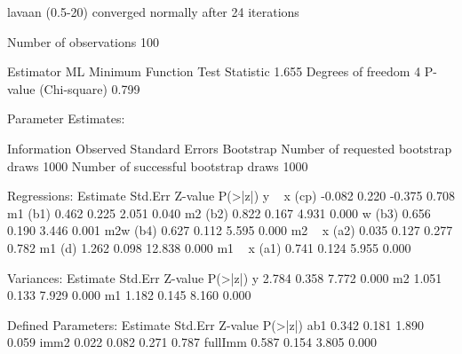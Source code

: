\begin{Schunk}
\begin{Soutput}
lavaan (0.5-20) converged normally after  24 iterations

  Number of observations                           100

  Estimator                                         ML
  Minimum Function Test Statistic                1.655
  Degrees of freedom                                 4
  P-value (Chi-square)                           0.799

Parameter Estimates:

  Information                                 Observed
  Standard Errors                            Bootstrap
  Number of requested bootstrap draws             1000
  Number of successful bootstrap draws            1000

Regressions:
                   Estimate  Std.Err  Z-value  P(>|z|)
  y ~                                                 
    x         (cp)   -0.082    0.220   -0.375    0.708
    m1        (b1)    0.462    0.225    2.051    0.040
    m2        (b2)    0.822    0.167    4.931    0.000
    w         (b3)    0.656    0.190    3.446    0.001
    m2w       (b4)    0.627    0.112    5.595    0.000
  m2 ~                                                
    x         (a2)    0.035    0.127    0.277    0.782
    m1         (d)    1.262    0.098   12.838    0.000
  m1 ~                                                
    x         (a1)    0.741    0.124    5.955    0.000

Variances:
                   Estimate  Std.Err  Z-value  P(>|z|)
    y                 2.784    0.358    7.772    0.000
    m2                1.051    0.133    7.929    0.000
    m1                1.182    0.145    8.160    0.000

Defined Parameters:
                   Estimate  Std.Err  Z-value  P(>|z|)
    ab1               0.342    0.181    1.890    0.059
    imm2              0.022    0.082    0.271    0.787
    fullImm           0.587    0.154    3.805    0.000
\end{Soutput}
\end{Schunk}
